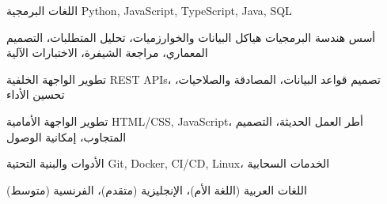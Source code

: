 
\begin{cvskills}

\cvskill
  {اللغات البرمجية}
  {\textenglish{Python, JavaScript, TypeScript, Java, SQL}}

\cvskill
  {أسس هندسة البرمجيات}
  {هياكل البيانات والخوارزميات، تحليل المتطلبات، التصميم المعماري، مراجعة الشيفرة، الاختبارات الآلية}

\cvskill
  {تطوير الواجهة الخلفية}
  {\textenglish{REST APIs}، تصميم قواعد البيانات، المصادقة والصلاحيات، تحسين الأداء}

\cvskill
  {تطوير الواجهة الأمامية}
  {\textenglish{HTML/CSS, JavaScript}، أطر العمل الحديثة، التصميم المتجاوب، إمكانية الوصول}

\cvskill
  {الأدوات والبنية التحتية}
  {\textenglish{Git, Docker, CI/CD, Linux}، الخدمات السحابية}

\cvskill
  {اللغات}
  {العربية (اللغة الأم)، الإنجليزية (متقدم)، الفرنسية (متوسط)}

\end{cvskills}
